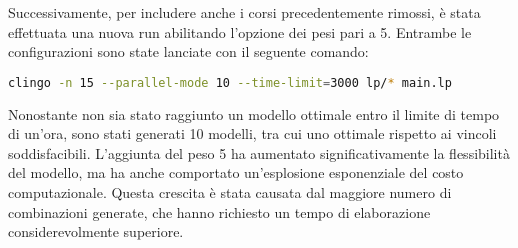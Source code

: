 Successivamente, per includere anche i corsi precedentemente rimossi, è stata 
effettuata una nuova run abilitando l'opzione dei pesi pari a 5. 
Entrambe le configurazioni sono state lanciate con il seguente comando:

\begin{lstlisting}[language=bash]
 clingo -n 15 --parallel-mode 10 --time-limit=3000 lp/* main.lp
\end{lstlisting}

Nonostante non sia stato raggiunto un modello ottimale entro il limite di tempo di un'ora, 
sono stati generati 10 modelli, tra cui uno ottimale rispetto ai vincoli soddisfacibili. 
L'aggiunta del peso 5 ha aumentato significativamente la flessibilità del modello, ma ha 
anche comportato un'esplosione esponenziale del costo computazionale. Questa crescita è 
stata causata dal maggiore numero di combinazioni generate, che hanno richiesto un tempo di 
elaborazione considerevolmente superiore.
